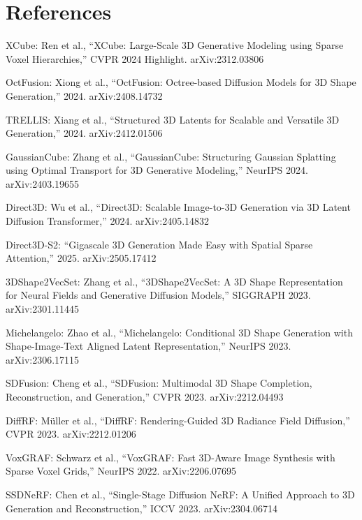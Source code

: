 \documentclass[11pt, a4paper]{article}
\begin{document}
\section{References}

\begin{enumerate}[label={[\arabic*]}]
    \item XCube: Ren et al., ``XCube: Large-Scale 3D Generative Modeling using Sparse Voxel Hierarchies,'' CVPR 2024 Highlight. arXiv:2312.03806
    \item OctFusion: Xiong et al., ``OctFusion: Octree-based Diffusion Models for 3D Shape Generation,'' 2024. arXiv:2408.14732
    \item TRELLIS: Xiang et al., ``Structured 3D Latents for Scalable and Versatile 3D Generation,'' 2024. arXiv:2412.01506
    \item GaussianCube: Zhang et al., ``GaussianCube: Structuring Gaussian Splatting using Optimal Transport for 3D Generative Modeling,'' NeurIPS 2024. arXiv:2403.19655
    \item Direct3D: Wu et al., ``Direct3D: Scalable Image-to-3D Generation via 3D Latent Diffusion Transformer,'' 2024. arXiv:2405.14832
    \item Direct3D-S2: ``Gigascale 3D Generation Made Easy with Spatial Sparse Attention,'' 2025. arXiv:2505.17412
    \item 3DShape2VecSet: Zhang et al., ``3DShape2VecSet: A 3D Shape Representation for Neural Fields and Generative Diffusion Models,'' SIGGRAPH 2023. arXiv:2301.11445
    \item Michelangelo: Zhao et al., ``Michelangelo: Conditional 3D Shape Generation with Shape-Image-Text Aligned Latent Representation,'' NeurIPS 2023. arXiv:2306.17115
    \item SDFusion: Cheng et al., ``SDFusion: Multimodal 3D Shape Completion, Reconstruction, and Generation,'' CVPR 2023. arXiv:2212.04493
    \item DiffRF: M\"uller et al., ``DiffRF: Rendering-Guided 3D Radiance Field Diffusion,'' CVPR 2023. arXiv:2212.01206
    \item VoxGRAF: Schwarz et al., ``VoxGRAF: Fast 3D-Aware Image Synthesis with Sparse Voxel Grids,'' NeurIPS 2022. arXiv:2206.07695
    \item SSDNeRF: Chen et al., ``Single-Stage Diffusion NeRF: A Unified Approach to 3D Generation and Reconstruction,'' ICCV 2023. arXiv:2304.06714

\end{enumerate}
\end{document}
